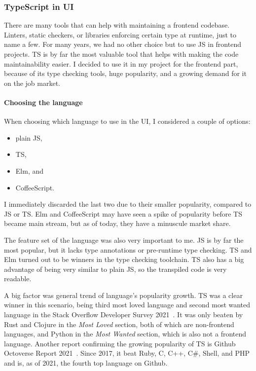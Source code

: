 \subsubsection{TypeScript in UI}\label{sec:typescript-in-ui}

There are many tools that can help with maintaining
a frontend codebase.
Linters,
static checkers,
or libraries enforcing certain type at runtime,
just to name a few.
For many years,
we had no other choice but to use
\ac{JS} in frontend projects.
\Acl{TS} is by far the most valuable tool that helps
with making the code maintainability easier.
I decided to use it in my project for the frontend part,
because of its type checking tools,
huge popularity,
and a growing demand for it on the job market.

\paragraph*{Choosing the language}\label{sec:choosing-the-language}

When choosing which language to use in the \ac{UI},
I considered a couple of options:

\begin{itemize}
  \item
        plain \acl{JS},
  \item
        \acl{TS},
  \item
        Elm, and
  \item
        CoffeeScript.
\end{itemize}

I immediately discarded the last two
due to their smaller popularity,
compared to \acl{JS} or \acl{TS}.
Elm and CoffeeScript may have seen
a spike of popularity before \acl{TS}
became main stream,
but as of today,
they have a minuscule market share.

The feature set of the language was also very important to me.
\Acl{JS} is by far the most popular,
but it lacks type annotations or pre-runtime type checking.
\Acl{TS} and Elm turned out to be winners in the type checking toolchain.
\Acl{TS} also has a big advantage of being very similar to plain \acl{JS},
so the transpiled code is very readable.

A big factor was general trend of language's popularity growth.
\Acl{TS} was a clear winner in this scenario,
being third most loved language
and second most wanted language
in the Stack Overflow Developer Survey 2021~\cite{stack_overflow_2021_2021}.
It was only beaten by Rust and Clojure
in the \textit{Most Loved} section,
both of which are non-frontend languages,
and Python in the \textit{Most Wanted} section,
which is also not a frontend language.
Another report confirming the growing popularity of \acl{TS}
is Github Octoverse Report 2021~\cite{github_inc_2021_2021}.
Since 2017,
it beat
Ruby,
C,
C++,
C\#,
Shell, and
\ac{PHP}
and is, as of 2021, the fourth top language on Github.

